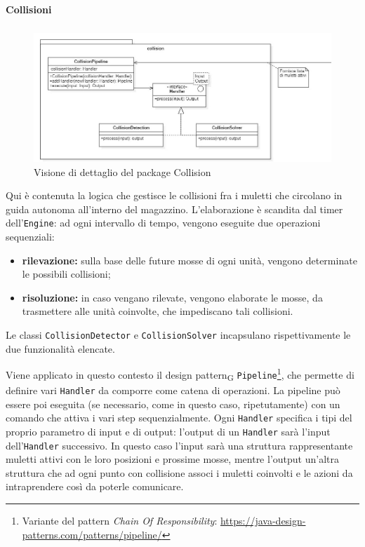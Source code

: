 \paragraph{Collisioni}
\label{collision-details}
\subparagraph*{ }

\begin{figure}[H]
	\centering
	\includegraphics[scale=0.50]{res/diagrams/server/server_pack_collision.jpg}
	\caption{Visione di dettaglio del package Collision}
\end{figure}


Qui è contenuta la logica che gestisce le collisioni fra i muletti che circolano in guida autonoma all'interno del magazzino. L'elaborazione è scandita dal timer dell'\texttt{Engine}: ad ogni intervallo di tempo, vengono eseguite due operazioni sequenziali:
\begin{itemize}
	\item \textbf{rilevazione:} sulla base delle future mosse di ogni unità, vengono determinate le possibili collisioni;
	\item \textbf{risoluzione:} in caso vengano rilevate, vengono elaborate le mosse, da trasmettere alle unità coinvolte, che impediscano tali collisioni.
\end{itemize}
Le classi \texttt{CollisionDetector} e \texttt{CollisionSolver} incapsulano rispettivamente le due funzionalità elencate.

Viene applicato in questo contesto il design pattern\textsubscript{G} \texttt{Pipeline}\footnote{Variante del pattern \textit{Chain Of Responsibility}: \url{https://java-design-patterns.com/patterns/pipeline/}}, che permette di definire vari \texttt{Handler} da comporre come catena di operazioni. La pipeline può essere poi eseguita (se necessario, come in questo caso, ripetutamente) con un comando che attiva i vari step sequenzialmente. Ogni \texttt{Handler} specifica i tipi del proprio parametro di input e di output: l'output di un \texttt{Handler} sarà l'input dell'\texttt{Handler} successivo.
In questo caso l'input sarà una struttura rappresentante muletti attivi con le loro posizioni e prossime mosse, mentre l'output un'altra struttura che ad ogni punto con collisione associ i muletti coinvolti e le azioni da intraprendere così da poterle comunicare.



